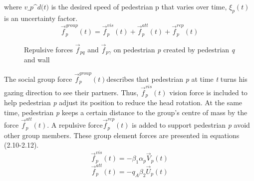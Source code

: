 \documentclass[a4paper,11pt,phdthesis,singlespace,twoside]{cssethesis}
\begin{document}
where \begin{math} \textit{v_{p}^{d}(t)} \end{math} is the desired speed of pedestrian p that varies over time, \begin{math} \xi_{p}(t)\end{math} is an uncertainty factor. 
\begin{equation}
\vec{f}_{p}^{group}(t)= \vec{f}_{p}^{vis}(t) + \vec{f}_{p}^{att}(t) + \vec{f}_{p}^{rep}(t)
\end{equation}
\begin{figure}[ht]
\begin{center}
\end{center}
\caption{Repulsive forces \begin{math}\vec{f}_{\textit{pq}} \end{math} and \begin{math}\vec{f}_{\textit{p$\gamma$}} \end{math} on pedestrian \textit{p} created by pedestrian \textit{q} and wall \gamma}
\label{fig:repulsive_force}
\end{figure}	
The social group force \begin{math}\vec{f}_{p}^{group}(t) \end{math}describes that pedestrian \textit{p} at time \textit{t} turns his gazing direction to see their partners. Thus, \begin{math} \vec{f}_{p}^{vis}(t)\end{math} vision force is included to help pedestrian \textit{p} adjust its position to reduce the head rotation. At the same time, pedestrian \textit{p} keeps a certain distance to the group's centre of mass by the force \begin{math}\vec{f}_{p}^{att}(t)\end{math}. A repulsive force\begin{math} \vec{f}_{p}^{rep}(t)\end{math} is added to support pedestrian \textit{p} avoid other group members. These group element forces are presented in equations (2.10-2.12).
\begin{equation}
\vec{f}_{p}^{vis}(t) = -\beta_{1}\alpha_{p}\vec{V}_{p}(t)
\end{equation}
\begin{equation}
\vec{f}_{p}^{att}(t) = -q_{A}\beta_{2}\vec{U}_{p}(t)
\end{equation}
\end{document}
